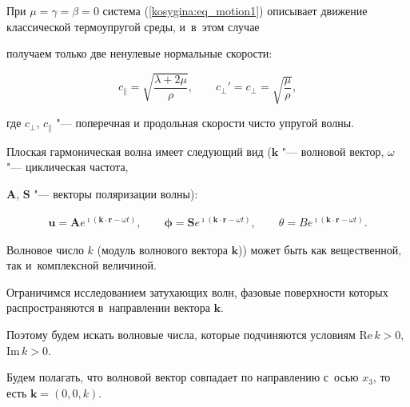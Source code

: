 При $\mu=\gamma=\beta=0$ система (\ref{kosygina:eq_motion1}) описывает движение классической термоупругой среды, и~в~этом случае

получаем только две ненулевые нормальные скорости:

$$

\displaystyle{c_{\parallel}=\sqrt{\frac{\lambda+2\mu}{\rho}},\qquad

c_{\bot}'=c_{\bot}=\sqrt{\frac{\mu}{\rho}}},

$$

где $c_{\bot}$, $c_{\parallel}$ "--- поперечная и продольная скорости чисто упругой волны.





\smallskip


Плоская гармоническая волна  имеет следующий вид ($\mathbf{ k}$ "--- волновой вектор, $\omega$ "--- циклическая частота,

$\mathbf{ A}$, $\mathbf{ S}$ "--- векторы поляризации волны):

\begin{equation}\label{kosygina:volna}\begin{array}{c}

\displaystyle{\mathbf{ u}=\mathbf{ A}e^{\imath(\mathbf{

k}\cdot\mathbf{ r}-\omega t)},}\qquad \displaystyle{\boldsymbol

\phi=\mathbf{ S}e^{\imath(\mathbf{ k}\cdot\mathbf{ r}-\omega

t)},}\qquad \displaystyle{\theta=B e^{\imath(\mathbf{ k}\cdot\mathbf{

r}-\omega t)}}.

\end{array}

\end{equation}



Волновое число $k$ (модуль волнового вектора $\mathbf{ k}$)) может быть как вещественной, так и~комплексной величиной. 

Ограничимся исследованием затухающих волн, фазовые поверхности которых распространяются в~направлении вектора $\mathbf{ k}$. 

Поэтому будем искать волновые числа, которые подчиняются условиям $ \textrm{Re}\,k>0$, $\textrm{Im}\, k>0$.

Будем полагать, что волновой вектор совпадает по направлению с~осью $x_{3}$, то есть $\mathbf{ k}=(0, 0, k)$. 


